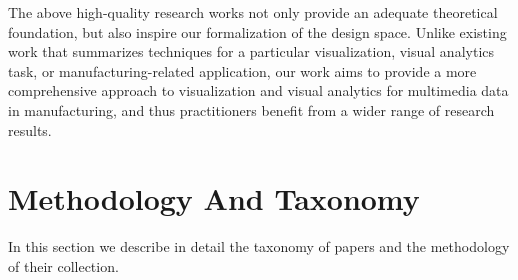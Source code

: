 \documentclass[a4paper,fleqn]{cas-dc}
\begin{document}
The above high-quality research works not only provide an adequate theoretical foundation, but also inspire our formalization of the design space. Unlike existing work that summarizes techniques for a particular visualization, visual analytics task, or manufacturing-related application, our work aims to provide a more comprehensive approach to visualization and visual analytics for multimedia data in manufacturing, and thus practitioners benefit from a wider range of research results.

\section{Methodology And Taxonomy}
In this section we describe in detail the taxonomy of papers and the methodology of their collection.  
 
\end{document}
